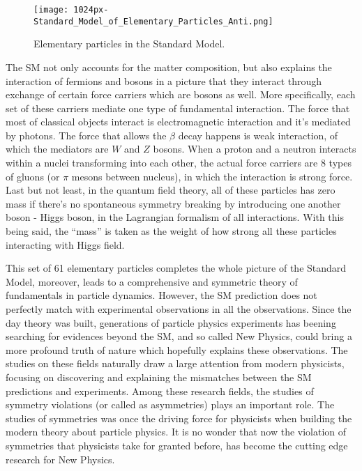 \begin{figure}[H]
	\centering
	\texttt{[image: 1024px-Standard\_Model\_of\_Elementary\_Particles\_Anti.png]}
	\caption{Elementary particles in the Standard Model.}
	\label{Fig 1-1}
\end{figure}

The SM not only accounts for the matter composition, but also explains the interaction of fermions and bosons in a picture that they interact through exchange of certain force carriers which are bosons as well. More specifically, each set of these carriers mediate one type of fundamental interaction. The force that most of classical objects interact is electromagnetic interaction and it's mediated by photons. The force that allows the $\beta$ decay happens is weak interaction, of which the mediators are $\textit{W}$ and $\textit{Z}$ bosons. When a proton and a neutron interacts within a nuclei transforming into each other, the actual force carriers are 8 types of gluons (or $\pi$ mesons between nucleus), in which the interaction is strong force. Last but not least, in the quantum field theory, all of these particles has zero mass if there's no spontaneous symmetry breaking by introducing one another boson - Higgs boson, in the Lagrangian formalism of all interactions. With this being said, the ``mass'' is taken as the weight of how strong all these particles interacting with Higgs field.

 This set of 61 elementary particles completes the whole picture of the Standard Model, moreover, leads to a comprehensive and symmetric theory of fundamentals in particle dynamics. However, the SM prediction does not perfectly match with experimental observations in all the observations. Since the day theory was built, generations of particle physics experiments has beening searching for evidences beyond the SM, and so called New Physics, could bring a more profound truth of nature which hopefully explains these observations. The studies on these fields naturally draw a large attention from modern physicists, focusing on discovering and explaining the mismatches between the SM predictions and experiments. Among these research fields, the studies of symmetry violations (or called as asymmetries) plays an important role. The studies of symmetries was once the driving force for physicists when building the modern theory about particle physics. It is no wonder that now the violation of symmetries that physicists take for granted before, has become the cutting edge research for New Physics. 





